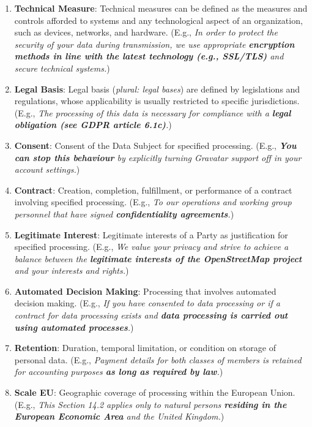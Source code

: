 \documentclass[a4paper,
               biblatex,     %
               hyphens,      %
               ]{jacow}
\begin{document}
\begin{enumerate}
    \item \textbf{Technical Measure}: Technical measures can be defined as the measures and controls afforded to systems and any technological aspect of an organization, such as devices, networks, and hardware. (E.g., \textit{In order to protect the security of your data during transmission, we use appropriate \textbf{encryption methods in line with the latest technology (e.g., SSL/TLS)} and secure technical systems.})
    
    \item \textbf{Legal Basis}: Legal basis (\textit{plural: legal bases}) are defined by legislations and regulations, whose applicability is usually restricted to specific jurisdictions. (E.g., \textit{The processing of this data is necessary for compliance with a \textbf{legal obligation (see GDPR article 6.1c)}.})

    \item \textbf{Consent}: Consent of the Data Subject for specified processing. (E.g., \textit{\textbf{You can stop this behaviour} by explicitly turning Gravatar support off in your account settings.})
    
    \item \textbf{Contract}: Creation, completion, fulfillment, or performance of a contract involving specified processing. (E.g., \textit{To our operations and working group personnel that have signed \textbf{confidentiality agreements}.})
    
    \item \textbf{Legitimate Interest}: Legitimate interests of a Party as justification for specified processing. (E.g., \textit{We value your privacy and strive to achieve a balance between the \textbf{legitimate interests of the OpenStreetMap project} and your interests and rights.})
    
    \item \textbf{Automated Decision Making}: Processing that involves automated decision making. (E.g., \textit{If you have consented to data processing or if a contract for data processing exists and \textbf{data processing is carried out using automated processes}.})
    
    \item \textbf{Retention}: Duration, temporal limitation, or condition on storage of personal data. (E.g., \textit{Payment details for both classes of members is retained for accounting purposes \textbf{as long as required by law}.})
    
    \item \textbf{Scale EU}: Geographic coverage of processing within the European Union. (E.g., \textit{This Section 14.2 applies only to natural persons \textbf{residing in the European Economic Area} and the United Kingdom.})
    

\end{enumerate}
\end{document}
